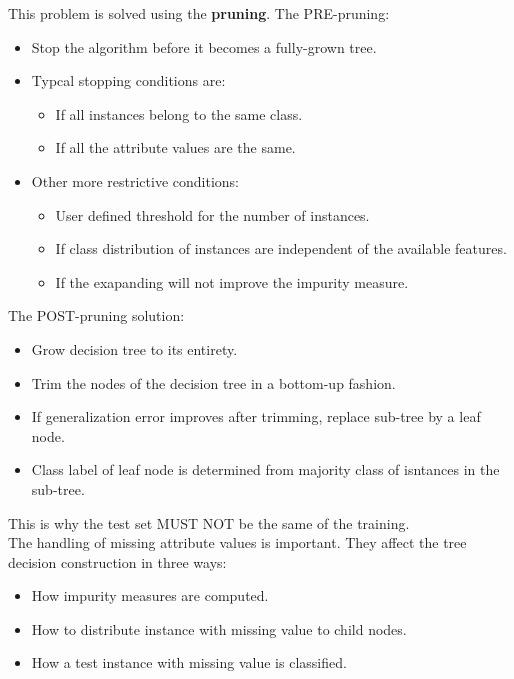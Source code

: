 \documentclass[12pt]{article}
\begin{document}
This problem is solved using the \textbf{pruning}. The PRE-pruning:
\begin{itemize}
  \item Stop the algorithm before it becomes a fully-grown tree.
  \item Typcal stopping conditions are:
  \begin{itemize}
    \item If all instances belong to the same class.
    \item If all the attribute values are the same.
  \end{itemize}
  \item Other more restrictive conditions:
  \begin{itemize}
    \item User defined threshold for the number of instances.
    \item If class distribution of instances are independent of the available features.
    \item If the exapanding will not improve the impurity measure.
  \end{itemize}
\end{itemize}
The POST-pruning solution:
\begin{itemize}
  \item Grow decision tree to its entirety.
  \item Trim the nodes of the decision tree in a bottom-up fashion.
  \item If generalization error improves after trimming, replace sub-tree by a leaf node.
  \item Class label of leaf node is determined from majority class of isntances in the sub-tree.
\end{itemize}
This is why the test set MUST NOT be the same of the training.\\
The handling of missing attribute values is important. They affect the tree decision construction in three ways:
\begin{itemize}
  \item How impurity measures are computed.
  \item How to distribute instance with missing value to child nodes.
  \item How a test instance with missing value is classified.
\end{itemize}
\end{document}
